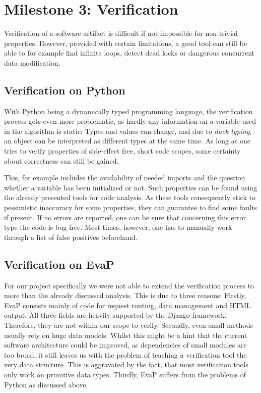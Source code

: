 \section{Milestone 3: Verification}

Verification of a software artifact is difficult if not impossible for non-trivial properties.
However, provided with certain limitations, a good tool can still be able to for example find infinite loops, detect dead locks or dangerous concurrent data modification.

\subsection{Verification on Python}

With Python being a dynamically typed programming language, the verification process gets even more problematic, as hardly any information on a variable used in the algorithm is static:
Types and values can change, and due to \textit{duck typing}, an object can be interpreted as different types at the same time.
As long as one tries to verify properties of side-effect free, short code scopes, some certainty about correctness can still be gained.

This, for example includes the availability of needed imports and the question whether a variable has been initialized or not.
Such properties can be found using the already presented tools for code analysis.
As these tools consequently stick to pessimistic inaccuracy for some properties, they can guarantee to find some faults if present.
If no errors are reported, one can be sure that concerning this error type the code is bug-free.
Most times, however, one has to manually work through a list of false positives beforehand.

\subsection{Verification on EvaP}

For our project specifically we were not able to extend the verification process to more than the already discussed analysis.
This is due to three reasons:
Firstly, EvaP consists mainly of code for request routing, data management and HTML output.
All three fields are heavily supported by the Django framework. Therefore, they are not within our scope to verify.
Secondly, even small methods usually rely on huge data models.
Whilst this might be a hint that the current software architecture could be improved, as dependencies of small modules are too broad, it still leaves us with the problem of teaching a verification tool the very data structure.
This is aggravated by the fact, that most verification tools only work on primitive data types.
Thirdly, EvaP suffers from the problems of Python as discussed above.

